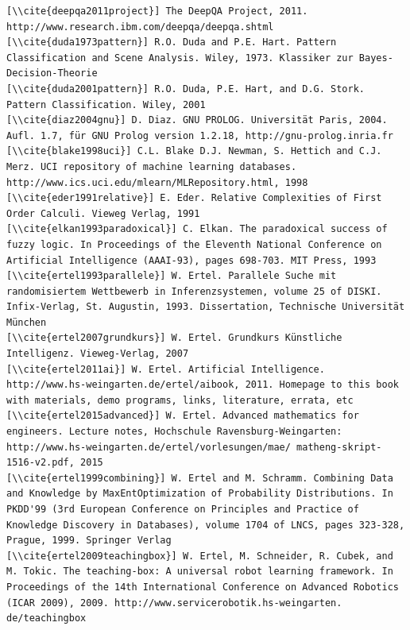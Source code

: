 \documentclass[10pt]{book}
\begin{document}
\begin{verbatim}
[\\cite{deepqa2011project}] The DeepQA Project, 2011. http://www.research.ibm.com/deepqa/deepqa.shtml
[\\cite{duda1973pattern}] R.O. Duda and P.E. Hart. Pattern Classification and Scene Analysis. Wiley, 1973. Klassiker zur Bayes-Decision-Theorie
[\\cite{duda2001pattern}] R.O. Duda, P.E. Hart, and D.G. Stork. Pattern Classification. Wiley, 2001
[\\cite{diaz2004gnu}] D. Diaz. GNU PROLOG. Universität Paris, 2004. Aufl. 1.7, für GNU Prolog version 1.2.18, http://gnu-prolog.inria.fr
[\\cite{blake1998uci}] C.L. Blake D.J. Newman, S. Hettich and C.J. Merz. UCI repository of machine learning databases. http://www.ics.uci.edu/mlearn/MLRepository.html, 1998
[\\cite{eder1991relative}] E. Eder. Relative Complexities of First Order Calculi. Vieweg Verlag, 1991
[\\cite{elkan1993paradoxical}] C. Elkan. The paradoxical success of fuzzy logic. In Proceedings of the Eleventh National Conference on Artificial Intelligence (AAAI-93), pages 698-703. MIT Press, 1993
[\\cite{ertel1993parallele}] W. Ertel. Parallele Suche mit randomisiertem Wettbewerb in Inferenzsystemen, volume 25 of DISKI. Infix-Verlag, St. Augustin, 1993. Dissertation, Technische Universität München
[\\cite{ertel2007grundkurs}] W. Ertel. Grundkurs Künstliche Intelligenz. Vieweg-Verlag, 2007
[\\cite{ertel2011ai}] W. Ertel. Artificial Intelligence. http://www.hs-weingarten.de/ertel/aibook, 2011. Homepage to this book with materials, demo programs, links, literature, errata, etc
[\\cite{ertel2015advanced}] W. Ertel. Advanced mathematics for engineers. Lecture notes, Hochschule Ravensburg-Weingarten: http://www.hs-weingarten.de/ertel/vorlesungen/mae/ matheng-skript-1516-v2.pdf, 2015
[\\cite{ertel1999combining}] W. Ertel and M. Schramm. Combining Data and Knowledge by MaxEntOptimization of Probability Distributions. In PKDD'99 (3rd European Conference on Principles and Practice of Knowledge Discovery in Databases), volume 1704 of LNCS, pages 323-328, Prague, 1999. Springer Verlag
[\\cite{ertel2009teachingbox}] W. Ertel, M. Schneider, R. Cubek, and M. Tokic. The teaching-box: A universal robot learning framework. In Proceedings of the 14th International Conference on Advanced Robotics (ICAR 2009), 2009. http://www.servicerobotik.hs-weingarten. de/teachingbox

\end{verbatim}
\end{document}
